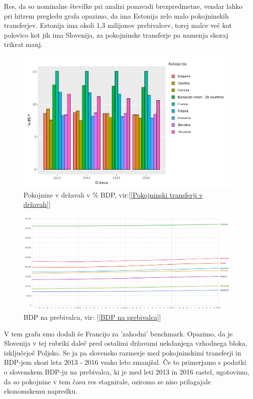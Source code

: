 \documentclass[12pt, a4paper]{article}
\begin{document}
Res, da so nominalne številke pri analizi ponavadi brezpredmetne, vendar lahko pri hitrem pregledu grafa opazimo, da ima Estonija zelo malo pokojninskih transferjev. Estonija ima okoli 1,3 milijonov prebivalcev, torej malce več kot polovico kot jih ima Slovenija, za pokojninske transferje pa namenja skoraj trikrat manj. 

\begin{figure}[h!]
\centering
\includegraphics[width = 13 cm]{pokojnine_bdp.png}
\caption{Pokojnine v državah v \% BDP, vir:[\ref{Pokojninski transferji v državah}]}
\label{Slika 7}
\end{figure}


\begin{figure}[h!]
\centering
\includegraphics[width = 13 cm]{bdp_per_capita.png}
\caption{BDP na prebivalca, vir: [\ref{BDP na prebivalca}]}
\label{Slika 8}
\end{figure}

\newpage
V tem grafu smo dodali še Francijo za 'zahodni' benchmark. Opazimo, da je Slovenija v tej rubriki daleč pred ostalimi državami nekdanjega vzhodnega bloka, izključejoč Poljsko. Se ja pa slovensko razmerje med pokojninskimi transferji in BDP-jem skozi leta 2013 - 2016 vsako leto zmanjšal. Če to primerjamo s podatki o slovenskem BDP-ju na prebivalca, ki je med leti 2013 in 2016 rastel, ugotovimo, da so pokojnine v tem času res stagnirale, oziroma se niso prilagajale ekonomskemu napredku.
\end{document}
